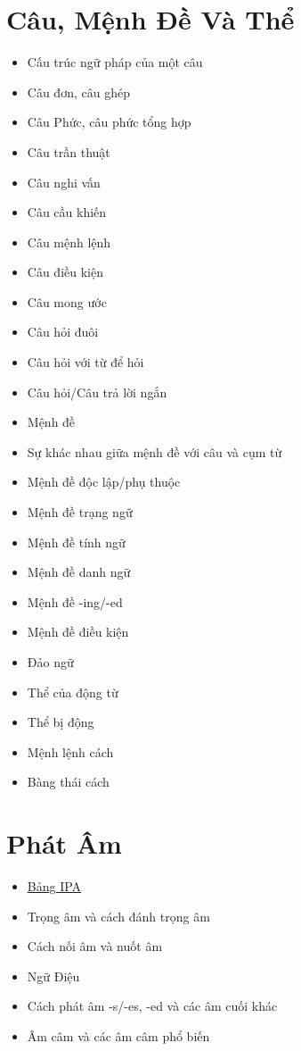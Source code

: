 \chapter{Câu, Mệnh Đề Và Thể}
\begin{multicols*}{2}
    \begin{itemize}
        \item Cấu trúc ngữ pháp của một câu
        \item Câu đơn, câu ghép
        \item Câu Phức, câu phức tổng hợp
        \item Câu trần thuật
        \item Câu nghi vấn
        \item Câu cầu khiến
        \item Câu mệnh lệnh
        \item Câu điều kiện
        \item Câu mong ước
        \item Câu hỏi đuôi
        \item Câu hỏi với từ để hỏi
        \item Câu hỏi/Câu trả lời ngắn
        \item Mệnh đề
        \item Sự khác nhau giữa mệnh đề với câu và cụm từ
        \item Mệnh đề độc lập/phụ thuộc
        \item Mệnh đề trạng ngữ
        \item Mệnh đề tính ngữ
        \item Mệnh đề danh ngữ
        \item Mệnh đề -ing/-ed
        \item Mệnh đề điều kiện
        \item Đảo ngữ
        \item Thể của động từ
        \item Thể bị động
        \item Mệnh lệnh cách
        \item Bàng thái cách
    \end{itemize}
\end{multicols*}

\chapter{Phát Âm}
\begin{multicols*}{2}
    \begin{itemize}
        \item \href{https://www.cambridge.org/features/IPAchart/}{Bảng IPA}
        \item Trọng âm và cách đánh trọng âm
        \item Cách nối âm và nuốt âm
        \item Ngữ Điệu
        \item Cách phát âm -s/-es, -ed và các âm cuối khác
        \item Âm câm và các âm câm phổ biến
    \end{itemize}
\end{multicols*}


